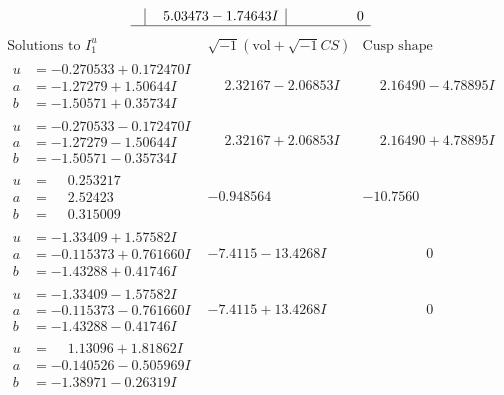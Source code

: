 \documentclass[1p]{elsarticle_modified}
\theoremstyle{definition}
\newcommand{\I}{\sqrt{-1}}
\begin{document}
$$\begin{array}{c|c|c}
 & \phantom{-}5.03473 - 1.74643 I & \phantom{-0.000000 } 0\\
 \hline 
 \end{array}$$\newpage$$\begin{array}{c|c|c}  
\text{Solutions to }I^u_{1}& \I (\text{vol} + \sqrt{-1}CS) & \text{Cusp shape}\\
 \hline 
\begin{aligned}
u &= -0.270533 + 0.172470 I \\
a &= -1.27279 + 1.50644 I \\
b &= -1.50571 + 0.35734 I\end{aligned}
 & \phantom{-}2.32167 - 2.06853 I & \phantom{-}2.16490 - 4.78895 I \\ \hline\begin{aligned}
u &= -0.270533 - 0.172470 I \\
a &= -1.27279 - 1.50644 I \\
b &= -1.50571 - 0.35734 I\end{aligned}
 & \phantom{-}2.32167 + 2.06853 I & \phantom{-}2.16490 + 4.78895 I \\ \hline\begin{aligned}
u &= \phantom{-}0.253217\phantom{ +0.000000I} \\
a &= \phantom{-}2.52423\phantom{ +0.000000I} \\
b &= \phantom{-}0.315009\phantom{ +0.000000I}\end{aligned}
 & -0.948564\phantom{ +0.000000I} & -10.7560\phantom{ +0.000000I} \\ \hline\begin{aligned}
u &= -1.33409 + 1.57582 I \\
a &= -0.115373 + 0.761660 I \\
b &= -1.43288 + 0.41746 I\end{aligned}
 & -7.4115 - 13.4268 I & \phantom{-0.000000 } 0 \\ \hline\begin{aligned}
u &= -1.33409 - 1.57582 I \\
a &= -0.115373 - 0.761660 I \\
b &= -1.43288 - 0.41746 I\end{aligned}
 & -7.4115 + 13.4268 I & \phantom{-0.000000 } 0 \\ \hline\begin{aligned}
u &= \phantom{-}1.13096 + 1.81862 I \\
a &= -0.140526 - 0.505969 I \\
b &= -1.38971 - 0.26319 I\end{aligned}

\end{array}$$
\end{document}
